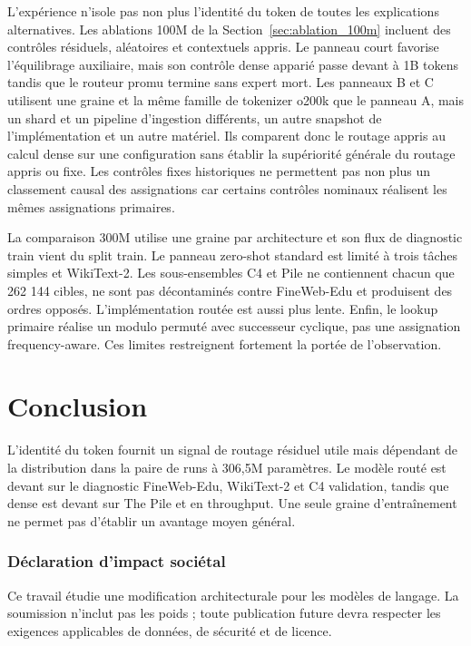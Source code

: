 \documentclass[10pt]{article}
\theoremstyle{definition}
\theoremstyle{remark}
\begin{document}
L'exp\'{e}rience n'isole pas non plus l'identit\'{e} du token de toutes les explications alternatives. Les ablations 100M de la Section~\ref{sec:ablation_100m} incluent des contr\^{o}les r\'{e}siduels, al\'{e}atoires et contextuels appris. Le panneau court favorise l'\'{e}quilibrage auxiliaire, mais son contr\^{o}le dense appari\'{e} passe devant \`{a} 1B tokens tandis que le routeur promu termine sans expert mort. Les panneaux B et C utilisent une graine et la m\^{e}me famille de tokenizer o200k que le panneau A, mais un shard et un pipeline d'ingestion diff\'{e}rents, un autre snapshot de l'impl\'{e}mentation et un autre mat\'{e}riel. Ils comparent donc le routage appris au calcul dense sur une configuration sans \'{e}tablir la sup\'{e}riorit\'{e} g\'{e}n\'{e}rale du routage appris ou fixe. Les contr\^{o}les fixes historiques ne permettent pas non plus un classement causal des assignations car certains contr\^{o}les nominaux r\'{e}alisent les m\^{e}mes assignations primaires.

La comparaison 300M utilise une graine par architecture et son flux de diagnostic train vient du split train. Le panneau zero-shot standard est limit\'{e} \`{a} trois t\^{a}ches simples et WikiText-2. Les sous-ensembles C4 et Pile ne contiennent chacun que 262 144 cibles, ne sont pas d\'{e}contamin\'{e}s contre FineWeb-Edu et produisent des ordres oppos\'{e}s. L'impl\'{e}mentation rout\'{e}e est aussi plus lente. Enfin, le lookup primaire r\'{e}alise un modulo permut\'{e} avec successeur cyclique, pas une assignation frequency-aware. Ces limites restreignent fortement la port\'{e}e de l'observation.

\section{Conclusion}
\label{sec:conclusion}

L'identit\'{e} du token fournit un signal de routage r\'{e}siduel utile mais d\'{e}pendant de la distribution dans la paire de runs \`{a} 306,5M param\`{e}tres. Le mod\`{e}le rout\'{e} est devant sur le diagnostic FineWeb-Edu, WikiText-2 et C4 validation, tandis que dense est devant sur The Pile et en throughput. Une seule graine d'entra\^{i}nement ne permet pas d'\'{e}tablir un avantage moyen g\'{e}n\'{e}ral.


\subsubsection*{D\'{e}claration d'impact soci\'{e}tal}
Ce travail \'{e}tudie une modification architecturale pour les mod\`{e}les de langage. La soumission n'inclut pas les poids ; toute publication future devra respecter les exigences applicables de donn\'{e}es, de s\'{e}curit\'{e} et de licence.
\end{document}
